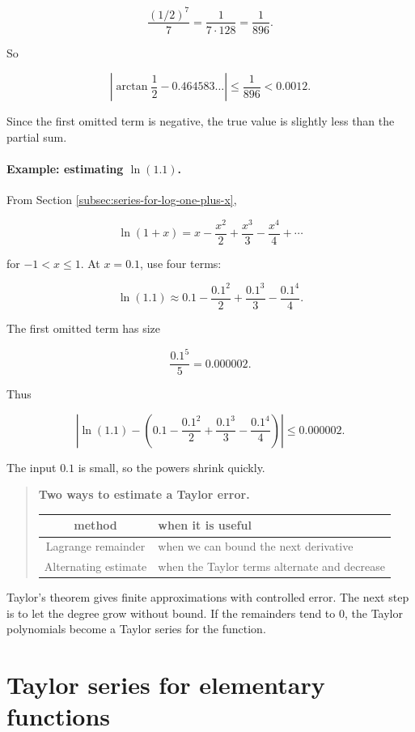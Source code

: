 \[
\frac{(1/2)^7}{7}
=
\frac1{7\cdot128}
=
\frac1{896}.
\]

So

\[
\boxed{
\left|
\arctan\frac12-0.464583\ldots
\right|
\le
\frac1{896}
<0.0012.
}
\]

Since the first omitted term is negative, the true value is slightly less than the
partial sum.

\paragraph{Example: estimating \(\ln(1.1)\).}
From Section \ref{subsec:series-for-log-one-plus-x},

\[
\ln(1+x)
=
x-\frac{x^2}{2}+\frac{x^3}{3}-\frac{x^4}{4}+\cdots
\]

for \(-1<x\le1\).  At \(x=0.1\), use four terms:

\[
\ln(1.1)
\approx
0.1-\frac{0.1^2}{2}+\frac{0.1^3}{3}-\frac{0.1^4}{4}.
\]

The first omitted term has size

\[
\frac{0.1^5}{5}=0.000002.
\]

Thus

\[
\boxed{
\left|
\ln(1.1)
-
\left(
0.1-\frac{0.1^2}{2}+\frac{0.1^3}{3}-\frac{0.1^4}{4}
\right)
\right|
\le 0.000002.
}
\]

The input \(0.1\) is small, so the powers shrink quickly.

\begin{quote}
\textbf{Two ways to estimate a Taylor error.}

\begin{center}
\begin{tabular}{c|l}
\textbf{method} & \textbf{when it is useful} \\ \hline
Lagrange remainder & when we can bound the next derivative \\[3pt]
Alternating estimate & when the Taylor terms alternate and decrease
\end{tabular}
\end{center}
\end{quote}

Taylor's theorem gives finite approximations with controlled error.  The next step is to
let the degree grow without bound.  If the remainders tend to \(0\), the Taylor
polynomials become a Taylor series for the function.

\section{Taylor series for elementary functions}
\label{sec:taylor-series-elementary-functions}

